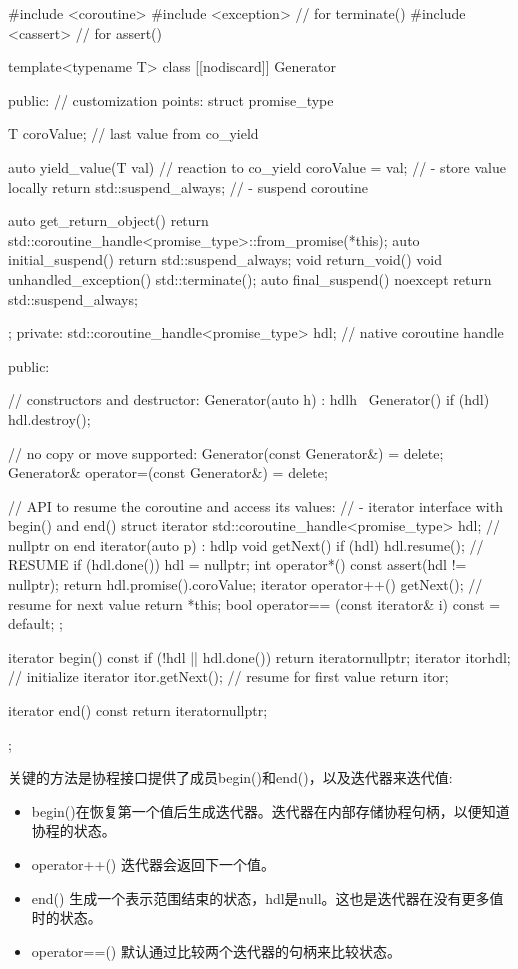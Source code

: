 \begin{cpp}
#include <coroutine>
#include <exception> // for terminate()
#include <cassert> // for assert()

template<typename T>
class [[nodiscard]] Generator {
	public:
	// customization points:
	struct promise_type {
		T coroValue{}; // last value from co_yield

		auto yield_value(T val) { // reaction to co_yield
			coroValue = val; // - store value locally
			return std::suspend_always{}; // - suspend coroutine
		}

		auto get_return_object() {
			return std::coroutine_handle<promise_type>::from_promise(*this);
		}
		auto initial_suspend() { return std::suspend_always{}; }
		void return_void() { }
		void unhandled_exception() { std::terminate(); }
		auto final_suspend() noexcept { return std::suspend_always{}; }
	};
private:
	std::coroutine_handle<promise_type> hdl; // native coroutine handle

public:

	// constructors and destructor:
	Generator(auto h) : hdl{h} { }
	~Generator() { if (hdl) hdl.destroy(); }

	// no copy or move supported:
	Generator(const Generator&) = delete;
	Generator& operator=(const Generator&) = delete;

	// API to resume the coroutine and access its values:
	// - iterator interface with begin() and end()
	struct iterator {
		std::coroutine_handle<promise_type> hdl; // nullptr on end
		iterator(auto p) : hdl{p} {
		}
		void getNext() {
			if (hdl) {
				hdl.resume(); // RESUME
				if (hdl.done()) {
					hdl = nullptr;
				}
			}
		}
		int operator*() const {
			assert(hdl != nullptr);
			return hdl.promise().coroValue;
		}
		iterator operator++() {
			getNext(); // resume for next value
			return *this;
		}
		bool operator== (const iterator& i) const = default;
	};

	iterator begin() const {
		if (!hdl || hdl.done()) {
			return iterator{nullptr};
		}
		iterator itor{hdl}; // initialize iterator
		itor.getNext(); // resume for first value
		return itor;
	}

	iterator end() const {
		return iterator{nullptr};
	}
};
\end{cpp}

关键的方法是协程接口提供了成员begin()和end()，以及迭代器来迭代值:

\begin{itemize}
\item
begin()在恢复第一个值后生成迭代器。迭代器在内部存储协程句柄，以便知道协程的状态。

\item
operator++() 迭代器会返回下一个值。

\item
end() 生成一个表示范围结束的状态，hdl是null。这也是迭代器在没有更多值时的状态。

\item
operator==() 默认通过比较两个迭代器的句柄来比较状态。
\end{itemize}

